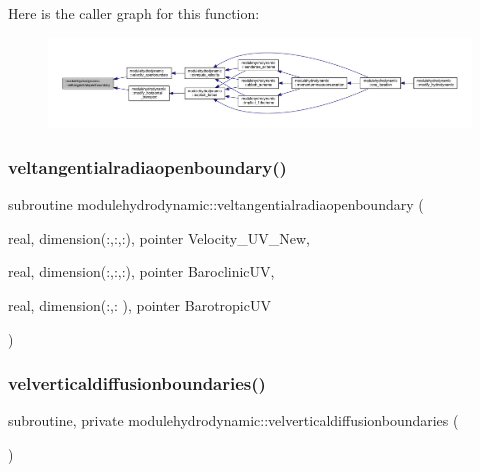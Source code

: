 Here is the caller graph for this function\+:\nopagebreak
\begin{figure}[H]
\begin{center}
\leavevmode
\includegraphics[width=350pt]{namespacemodulehydrodynamic_a0be051dfb2855eb7014145fceaa64075_icgraph}
\end{center}
\end{figure}
\mbox{\label{namespacemodulehydrodynamic_a52c5b67b475eb26914ed1a1975345d69}} 
\subsubsection{\texorpdfstring{veltangentialradiaopenboundary()}{veltangentialradiaopenboundary()}}
{\footnotesize\ttfamily subroutine modulehydrodynamic\+::veltangentialradiaopenboundary (\begin{DoxyParamCaption}\item[{real, dimension(\+:,\+:,\+:), pointer}]{Velocity\+\_\+\+U\+V\+\_\+\+New,  }\item[{real, dimension(\+:,\+:,\+:), pointer}]{Baroclinic\+UV,  }\item[{real, dimension(\+:,\+:  ), pointer}]{Barotropic\+UV }\end{DoxyParamCaption})\hspace{0.3cm}{\ttfamily [private]}}

\mbox{\label{namespacemodulehydrodynamic_a10da15941f53c4274a4bfa5fec56a6ad}} 
\subsubsection{\texorpdfstring{velverticaldiffusionboundaries()}{velverticaldiffusionboundaries()}}
{\footnotesize\ttfamily subroutine, private modulehydrodynamic\+::velverticaldiffusionboundaries (\begin{DoxyParamCaption}{ }\end{DoxyParamCaption})\hspace{0.3cm}{\ttfamily [private]}}

